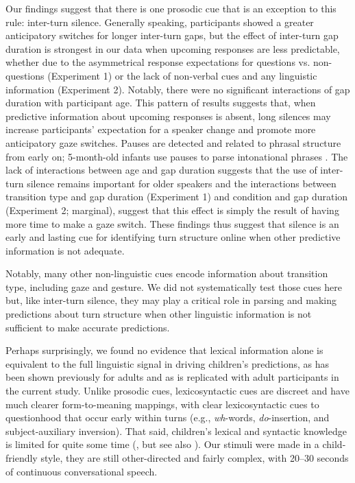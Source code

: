 \documentclass[authoryear, 12pt]{elsarticle}
\begin{document}
Our findings suggest that there is one prosodic cue that is an exception to this rule: inter-turn silence. Generally speaking, participants showed a greater anticipatory switches for longer inter-turn gaps, but the effect of inter-turn gap duration is strongest in our data when upcoming responses are less predictable, whether due to the asymmetrical response expectations for questions vs. non-questions (Experiment 1) or the lack of non-verbal cues and any linguistic information (Experiment 2). Notably, there were no significant interactions of gap duration with participant age. This pattern of results suggests that, when predictive information about upcoming responses is absent, long silences may increase participants' expectation for a speaker change and promote more anticipatory gaze switches. Pauses are detected and related to phrasal structure from early on; 5-month-old infants use pauses to parse intonational phrases \citep{mannel2009}. The lack of interactions between age and gap duration suggests that the use of inter-turn silence remains important for older speakers and the interactions between transition type and gap duration (Experiment 1) and condition and gap duration (Experiment 2; marginal), suggest that this effect is simply the result of having more time to make a gaze switch. These findings thus suggest that silence is an early and lasting cue for identifying turn structure online when other predictive information is not adequate.

Notably, many other non-linguistic cues encode information about transition type, including gaze and gesture. We did not systematically test those cues here but, like inter-turn silence, they may play a critical role in parsing and making predictions about turn structure when other linguistic information is not sufficient to make accurate predictions.


Perhaps surprisingly, we found no evidence that lexical information alone is equivalent to the full linguistic signal in driving children's predictions, as has been shown previously for adults \citep{magyari2012, de-ruiter2006} and as is replicated with adult participants in the current study. Unlike prosodic cues, lexicosyntactic cues are discreet and have much clearer form-to-meaning mappings, with clear lexicosyntactic cues to questionhood that occur early within turns (e.g., \textit{wh}-words, \textit{do}-insertion, and subject-auxiliary inversion). That said, children's lexical and syntactic knowledge is limited for quite some time (\citealp{tomasello1999}, but see also \citealp{bergelson2013, shi2010}). Our stimuli were made in a child-friendly style, they are still other-directed and fairly complex, with 20--30 seconds of continuous conversational speech.
\end{document}

